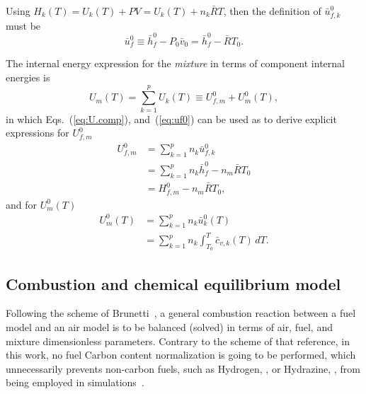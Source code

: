     Using $H_k(T) = U_k(T) + PV = U_k(T) + n_k\bar{R}T$, then the definition of $\bar{u}^0_{f,k}$ must be%
    \begin{equation}
        \bar{u}_f^0 \equiv \bar{h}_f^0 - P_0\bar{v}_0 = \bar{h}_f^0 - \bar{R}T_0.
        \label{eq:uf0}
    \end{equation}

    The internal energy expression for the \emph{mixture} in terms of component internal energies is%
    \begin{equation}
        U_m(T) = \sum_{k=1}^p U_k(T) \equiv U^0_{f,m} + U^0_m(T),
        \label{eq:U.mix}
    \end{equation}
    \noindent in which Eqs.~(\ref{eq:U.comp}), and~(\ref{eq:uf0}) can be used as to derive explicit expressions for $U^0_{f,m}$%
    \begin{align}
        U^0_{f,m}   &= \sum_{k=1}^p n_k\bar{u}^0_{f,k} \nonumber\\
                    &= \sum_{k=1}^p n_k\bar{h}_f^0 - n_m\bar{R}T_0 \nonumber\\
                    &= H^0_{f,m} - n_m\bar{R}T_0,
        \label{eq:Uf0.mix}
    \end{align}
    \noindent and for $U^0_m(T)$%
    \begin{align}
        U^0_m(T)    &= \sum_{k=1}^p n_k\bar{u}^0_k(T) \nonumber\\
                    &= \sum_{k=1}^p n_k \int_{T_0}^T \bar{c}_{v,k}(T)\,dT.
        \label{eq:U0.mix}
    \end{align}


    \subsection{Combustion and chemical equilibrium model}\label{sec:model.cchemm}

    Following the scheme of Brunetti~\cite{2012-BrunettiF-Blucher}, a general combustion reaction between a fuel model and an air model is to be balanced (solved) in terms of  air,  fuel,  and
    mixture dimensionless parameters. Contrary to the scheme of that reference, in this work, no fuel Carbon content normalization is  going  to  be  performed,  which  unnecessarily  prevents
    non-carbon fuels, such as Hydrogen, , or Hydrazine, , from being employed in simulations~\cite{2018-SilvaRKO-UTFPR}.

